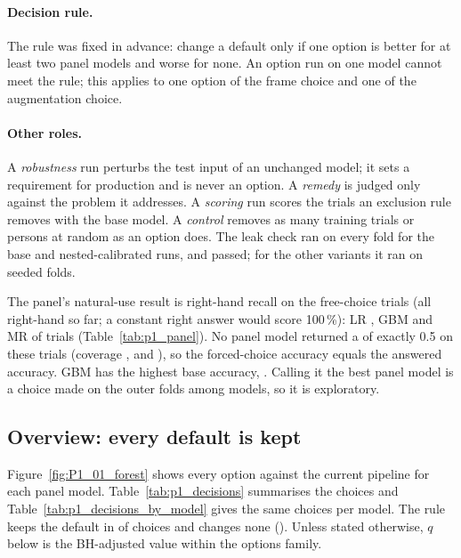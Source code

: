 \paragraph{Decision rule.} The rule was fixed in advance: change a default only if one option is better for
at least two panel models and worse for none. An option run on one model cannot meet the rule; this
applies to one option of the frame choice and one of the augmentation choice.

\paragraph{Other roles.} A \emph{robustness} run perturbs the test input of an unchanged model; it sets a
requirement for production and is never an option. A \emph{remedy} is judged only against the problem it
addresses. A \emph{scoring} run scores the trials an exclusion rule removes with the base model. A
\emph{control} removes as many training trials or persons at random as an option does. The leak check
ran on every fold for the base and nested-calibrated runs, and passed; for the other variants it ran on
 seeded folds.


The panel's natural-use result is right-hand recall on the free-choice trials (all right-hand so far; a
constant right answer would score 100\,\%): LR , GBM  and MR
 of  trials (Table~\ref{tab:p1_panel}). No panel model returned a
\pright{} of exactly 0.5 on these trials (coverage ,  and
), so the forced-choice accuracy equals the answered accuracy.
GBM has the highest base accuracy, . Calling it the best panel model is a choice made
on the outer folds among  models, so it is exploratory.

\subsection{Overview: every default is kept}\label{app:prep:overview}

Figure~\ref{fig:P1_01_forest} shows every option against the current pipeline for each panel model.
Table~\ref{tab:p1_decisions} summarises the  choices and Table~\ref{tab:p1_decisions_by_model}
gives the same choices per model. The rule keeps the default in  of 
choices and changes none (). Unless stated otherwise, $q$ below is the BH-adjusted
value within the options family.

